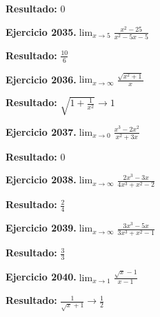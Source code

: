 \documentclass[10pt,a4paper]{article}
\begin{document}
\begin{solbox}
\textbf{Resultado:} \(\displaystyle 0\)
\end{solbox}

\begin{ejbox}
\textbf{Ejercicio 2035.}\quad $\lim_{x\to 5} \frac{x^2-25}{x^2-5x-5}$
\end{ejbox}

\begin{solbox}
\textbf{Resultado:} \(\displaystyle \frac{10}{6}\)
\end{solbox}

\newpage
\begin{ejbox}
\textbf{Ejercicio 2036.}\quad $\lim_{x\to \infty} \frac{\sqrt{x^2+1}}{x}$
\end{ejbox}

\begin{solbox}
\textbf{Resultado:} \(\displaystyle \sqrt{1+\frac{1}{x^2}} \to 1\)
\end{solbox}

\begin{ejbox}
\textbf{Ejercicio 2037.}\quad $\lim_{x\to 0} \frac{x^3-2x^2}{x^2+3x}$
\end{ejbox}

\begin{solbox}
\textbf{Resultado:} \(\displaystyle 0\)
\end{solbox}

\begin{ejbox}
\textbf{Ejercicio 2038.}\quad $\lim_{x\to \infty} \frac{2x^3 - 3x}{4x^3 + x^2 - 2}$
\end{ejbox}

\begin{solbox}
\textbf{Resultado:} \(\displaystyle \frac{2}{4}\)
\end{solbox}

\newpage
\begin{ejbox}
\textbf{Ejercicio 2039.}\quad $\lim_{x\to \infty} \frac{3x^3 - 5x}{3x^3 + x^2 - 1}$
\end{ejbox}

\begin{solbox}
\textbf{Resultado:} \(\displaystyle \frac{3}{3}\)
\end{solbox}

\begin{ejbox}
\textbf{Ejercicio 2040.}\quad $\lim_{x\to 1} \frac{\sqrt{x}-1}{x-1}$
\end{ejbox}

\begin{solbox}
\textbf{Resultado:} \(\displaystyle \frac{1}{\sqrt{x}+1} \to \frac{1}{2}\)
\end{solbox}
\end{document}
